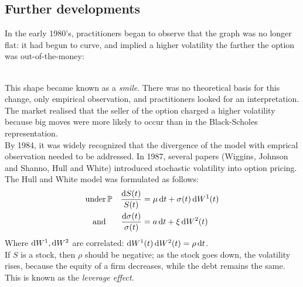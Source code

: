 \documentclass[11pt]{article}
\begin{document}
\subsection{Further developments}
In the early 1980's, practitioners began to observe that the graph was no longer flat: it had begun to curve, and implied a higher volatility the farther the option was out-of-the-money: \\

 \\

This shape became known as a {\em smile}. There was no theoretical basis for this change, only empirical observation, and practitioners looked for an interpretation. The market realised that the seller of the option charged a higher volatility because big moves were more likely to occur than in the Black-Scholes representation. \\

By 1984, it was widely recognized that the divergence of the model with emprical observation needed to be addressed. In 1987, several papers (Wiggins, Johnson and Shanno, Hull and White) introduced stochastic volatility into option pricing. The Hull and White model was formulated as follows:
\begin{align*}
\text{under}& \Pmeas & \frac{\dif S(t)}{S(t)} &= \mu \dif t + \sigma(t) \dif W^1(t) \\
 \text{and}& & \frac{\dif \sigma(t)}{\sigma(t)} &= a \dif t + \xi \dif W^2(t)
\end{align*}
Where $\dif W^1, \dif W^2$ are correlated: $\dif W^1(t) \dif W^2(t) = \rho \dif t$. \\

If $S$ is a stock, then $\rho$ should be negative; as the stock goes down, the volatility rises, because the equity of a firm decreases, while the debt remains the same. This is known as the {\em leverage effect}.
\end{document}
